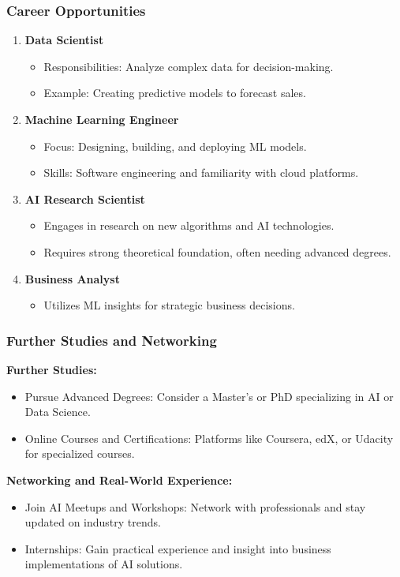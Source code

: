 \documentclass{beamer}
\begin{document}
\begin{frame}[fragile]
    \frametitle{Career Opportunities}
    \begin{enumerate}
        \item \textbf{Data Scientist}
            \begin{itemize}
                \item Responsibilities: Analyze complex data for decision-making.
                \item Example: Creating predictive models to forecast sales.
            \end{itemize}
        \item \textbf{Machine Learning Engineer}
            \begin{itemize}
                \item Focus: Designing, building, and deploying ML models.
                \item Skills: Software engineering and familiarity with cloud platforms.
            \end{itemize}
        \item \textbf{AI Research Scientist}
            \begin{itemize}
                \item Engages in research on new algorithms and AI technologies.
                \item Requires strong theoretical foundation, often needing advanced degrees.
            \end{itemize}
        \item \textbf{Business Analyst}
            \begin{itemize}
                \item Utilizes ML insights for strategic business decisions.
            \end{itemize}
    \end{enumerate}
\end{frame}

\begin{frame}[fragile]
    \frametitle{Further Studies and Networking}
    \textbf{Further Studies:}
    \begin{itemize}
        \item Pursue Advanced Degrees: Consider a Master's or PhD specializing in AI or Data Science.
        \item Online Courses and Certifications: Platforms like Coursera, edX, or Udacity for specialized courses.
    \end{itemize}
    
    \textbf{Networking and Real-World Experience:}
    \begin{itemize}
        \item Join AI Meetups and Workshops: Network with professionals and stay updated on industry trends.
        \item Internships: Gain practical experience and insight into business implementations of AI solutions.
    \end{itemize}
\end{frame}
\end{document}
